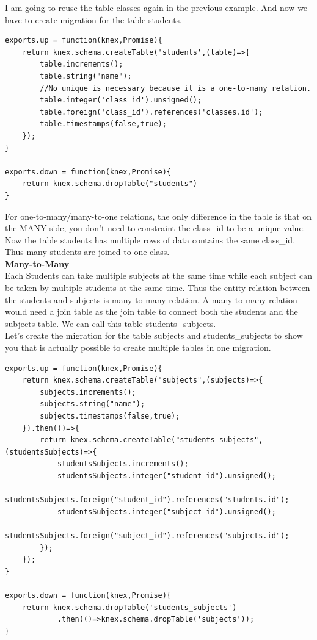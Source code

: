 \documentclass[a4paper]{article}
\begin{document}
I am going to reuse the table classes again in the previous example. And now we have to create migration for the table students.
\begin{lstlisting}
exports.up = function(knex,Promise){
    return knex.schema.createTable('students',(table)=>{
        table.increments();
        table.string("name");
        //No unique is necessary because it is a one-to-many relation.
        table.integer('class_id').unsigned();
        table.foreign('class_id').references('classes.id');
        table.timestamps(false,true);
    });
}

exports.down = function(knex,Promise){
    return knex.schema.dropTable("students")
}
\end{lstlisting}
For one-to-many/many-to-one relations, the only difference in the table is that on the MANY side, you don’t need to constraint the class_id to be a unique value. Now the table students has multiple rows of data contains the same class_id. Thus many students are joined to one class.\\

\textbf{Many-to-Many}\\

Each Students can take multiple subjects at the same time while each subject can be taken by multiple students at the same time. Thus the entity relation between the students and subjects is many-to-many relation. A many-to-many relation would need a join table as the join table to connect both the students and the subjects table. We can call this table students_subjects.\\

Let’s create the migration for the table subjects and students_subjects to show you that is actually possible to create multiple tables in one migration.
\begin{lstlisting}
exports.up = function(knex,Promise){
    return knex.schema.createTable("subjects",(subjects)=>{
        subjects.increments();
        subjects.string("name");
        subjects.timestamps(false,true);
    }).then(()=>{
        return knex.schema.createTable("students_subjects",(studentsSubjects)=>{
            studentsSubjects.increments();
            studentsSubjects.integer("student_id").unsigned();
            studentsSubjects.foreign("student_id").references("students.id");
            studentsSubjects.integer("subject_id").unsigned();
            studentsSubjects.foreign("subject_id").references("subjects.id");
        });
    });
}

exports.down = function(knex,Promise){
    return knex.schema.dropTable('students_subjects')
            .then(()=>knex.schema.dropTable('subjects'));
}
\end{lstlisting}
\end{document}
